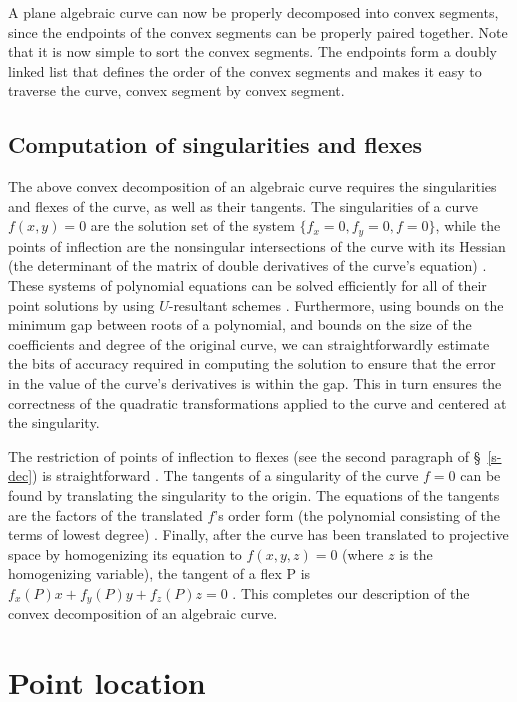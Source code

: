 A plane algebraic curve can now be properly decomposed into convex segments,
since the endpoints of the convex segments can be properly paired together.
Note that it is now simple to sort the convex segments.
The endpoints form a doubly linked list
that defines the order of the convex segments
and makes it easy to traverse the curve, convex segment by convex segment.

\subsection{Computation of singularities and flexes}
\label{ssc}

The above convex decomposition of an algebraic curve requires the singularities 
and flexes of the curve, as well as their tangents.
The singularities of a curve $f(x,y)=0$ are the solution set of the system
$\{f_{x}=0,f_{y}=0,f=0\}$, while the points of inflection are the nonsingular 
intersections of the curve with its Hessian (the determinant 
of the matrix of double derivatives of the curve's equation) \cite{walker}.
%
These systems of polynomial equations can be solved efficiently 
for all of their point solutions by using $U$-resultant schemes \cite{Ca}. 
Furthermore, using bounds on the minimum gap between roots of a polynomial, 
and bounds on the
size of the coefficients and degree of the original curve, we can straightforwardly
estimate the bits of accuracy required in computing the solution 
to ensure that the error in the value of the curve's derivatives is within the gap. 
This in turn ensures the correctness of the quadratic transformations applied to the 
curve and centered at the singularity.

The restriction of points of inflection to flexes (see the 
second paragraph of \S~\ref{s-dec})
is straightforward \cite[p. 44]{jj}.
The tangents of a singularity of the curve $f=0$ can be found by translating 
the singularity to the origin.
The equations of the tangents are the factors of the translated $f$'s order
form (the polynomial consisting of the terms of lowest degree) \cite{walker}.
Finally, after the curve has been translated to projective space by homogenizing 
its equation to $f(x,y,z)=0$ (where $z$ is the homogenizing variable),
the tangent of a flex P is $f_{x}(P)x + f_{y}(P)y + f_{z}(P)z= 0$ \cite{walker}.
This completes our description of the convex decomposition of an algebraic curve.

\section{Point location}
\label{s-loc}

